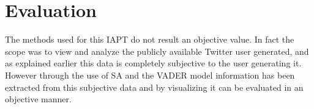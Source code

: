 \chapter{Evaluation}


The methods used for this \ac{IAPT} do not result an objective value.
In fact the scope was to view and analyze the publicly available Twitter user generated, and as explained earlier this data is completely subjective to the user generating it.
However through the use of \ac{SA} and the \ac{VADER} model information has been extracted from this subjective data and by visualizing it can be evaluated in an objective manner.
